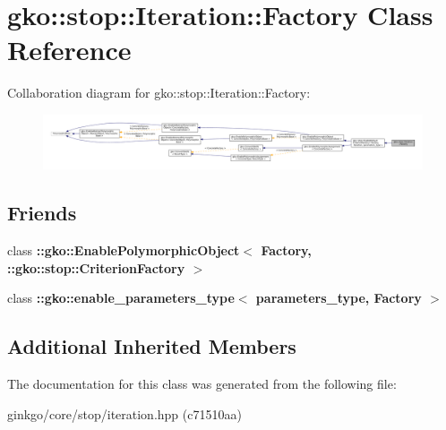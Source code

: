 \hypertarget{classgko_1_1stop_1_1Iteration_1_1Factory}{}\section{gko\+:\+:stop\+:\+:Iteration\+:\+:Factory Class Reference}
\label{classgko_1_1stop_1_1Iteration_1_1Factory}


Collaboration diagram for gko\+:\+:stop\+:\+:Iteration\+:\+:Factory\+:
\nopagebreak
\begin{figure}[H]
\begin{center}
\leavevmode
\includegraphics[width=350pt]{classgko_1_1stop_1_1Iteration_1_1Factory__coll__graph}
\end{center}
\end{figure}
\subsection*{Friends}
\begin{DoxyCompactItemize}
\item 
\mbox{\label{classgko_1_1stop_1_1Iteration_1_1Factory_aaa5507cf00e5361a77971746fefa42e6}} 
class {\bfseries \+::gko\+::\+Enable\+Polymorphic\+Object$<$ Factory, \+::gko\+::stop\+::\+Criterion\+Factory $>$}
\item 
\mbox{\label{classgko_1_1stop_1_1Iteration_1_1Factory_a0d176cbd42d6214e11aee8c30ca256fc}} 
class {\bfseries \+::gko\+::enable\+\_\+parameters\+\_\+type$<$ parameters\+\_\+type, Factory $>$}
\end{DoxyCompactItemize}
\subsection*{Additional Inherited Members}


The documentation for this class was generated from the following file\+:\begin{DoxyCompactItemize}
\item 
ginkgo/core/stop/iteration.\+hpp (c71510aa)\end{DoxyCompactItemize}
